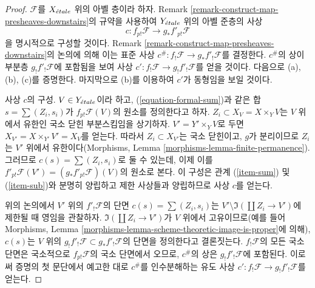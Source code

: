 \begin{proof}
$\mathcal{F}$를 $X_{\acute{e}tale}$ 위의 아벨 층이라 하자. Remark
\ref{remark-construct-map-presheaves-downstairs}의 규약을 사용하여
$Y_{\acute{e}tale}$ 위의 아벨 준층의 사상
$$
c : f_{p!}\mathcal{F} \longrightarrow g_*f'_{p!}\mathcal{F}
$$
을 명시적으로 구성할 것이다. Remark
\ref{remark-construct-map-presheaves-downstairs}의 논의에 의해 이는
표준 사상 $c^\# : f_!\mathcal{F} \to g_*f'_!\mathcal{F}$를 결정한다.
$c^\#$의 상이 부분층 $g_!f'_!\mathcal{F}$에 포함됨을 보여 사상
$c' : f_!\mathcal{F} \to g_!f'_!\mathcal{F}$를 얻을 것이다.
다음으로 (a), (b), (c)를 증명한다. 마지막으로 (b)를 이용하여
$c'$가 동형임을 보일 것이다.

\medskip\noindent
사상 $c$의 구성. $V \in Y_{\acute{e}tale}$이라 하고,
(\ref{equation-formal-sum})과 같은 합 $s = \sum (Z_i, s_i)$가
$f_{p!}\mathcal{F}(V)$의 원소를 정의한다고 하자.
$Z_i \subset X_V = X \times_Y V$는 $V$ 위에서 유한인 국소 닫힌
부분스킴임을 상기하자. $V' = Y' \times_Y V$로 두면
$X_{V'} = X \times_{Y'} V' = X_V$를 얻는다. 따라서
$Z_i \subset X_{V'}$는 국소 닫힌이고, $g$가 분리이므로
$Z_i$는 $V'$ 위에서 유한이다(Morphisms, Lemma
\ref{morphisms-lemma-finite-permanence}). 그러므로
$c(s) = \sum (Z_i, s_i)$로 둘 수 있는데, 이제 이를
$f'_{p!}\mathcal{F}(V') = (g_*f'_{p!}\mathcal{F})(V)$의 원소로 본다.
이 구성은 관계 (\ref{item-sum}) 및 (\ref{item-sub})와 분명히
양립하고 제한 사상들과 양립하므로 사상 $c$를 얻는다.

\medskip\noindent
위의 논의에서 $V'$ 위의 $f'_!\mathcal{F}$의 단면
$c(s) = \sum (Z_i, s_i)$는
$V' \setminus \Im(\coprod Z_i \to V')$에 제한될 때 영임을 관찰하자.
$\Im(\coprod Z_i \to V')$가 $V$ 위에서 고유이므로(예를 들어
Morphisms, Lemma
\ref{morphisms-lemma-scheme-theoretic-image-is-proper}에 의해),
$c(s)$는 $V$ 위의 $g_!f'_!\mathcal{F} \subset g_*f'_!\mathcal{F}$의
단면을 정의한다고 결론짓는다. $f_!\mathcal{F}$의 모든 국소 단면은
국소적으로 $f_{p!}\mathcal{F}$의 국소 단면에서 오므로,
$c^\#$의 상은 $g_!f'_!\mathcal{F}$에 포함된다. 이로써 증명의 첫
문단에서 예고한 대로 $c^\#$를 인수분해하는 유도 사상
$c' : f_!\mathcal{F} \to g_!f'_!\mathcal{F}$를 얻는다.


\end{proof}
